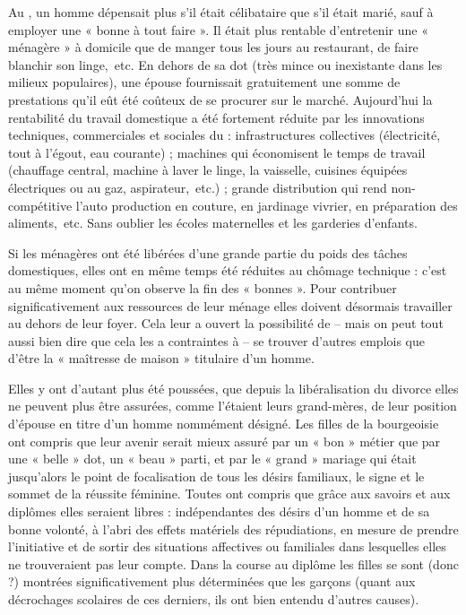  Au , un homme dépensait plus s'il était célibataire que s'il était marié, sauf à employer une « bonne à tout faire ». Il était plus rentable d'entretenir une « ménagère » à domicile que de manger tous les jours au restaurant, de faire blanchir son linge,~etc. En dehors de sa dot (très mince ou inexistante dans les milieux populaires), une épouse fournissait gratuitement une somme de prestations qu'il eût été coûteux de se procurer sur le marché. Aujourd'hui la rentabilité du travail domestique a été fortement réduite par les innovations techniques, commerciales et sociales du  : infrastructures collectives (électricité, tout à l'égout, eau courante) ; machines qui économisent le temps de travail (chauffage central, machine à laver le linge, la vaisselle, cuisines équipées électriques ou au gaz, aspirateur,~etc.) ; grande distribution qui rend non-compétitive l'auto production en couture, en jardinage vivrier, en préparation des aliments,~etc. Sans oublier les écoles maternelles et les garderies d'enfants. 

 Si les ménagères ont été libérées d'une grande partie du poids des tâches domestiques, elles ont en même temps été réduites au chômage technique : c'est au même moment qu'on observe la fin des « bonnes ». Pour contribuer significativement aux ressources de leur ménage elles doivent désormais travailler au dehors de leur foyer. Cela leur a ouvert la possibilité de -- mais on peut tout aussi bien dire que cela les a contraintes à -- se trouver d'autres emplois que d'être la « maîtresse de maison » titulaire d'un homme. 

 Elles y ont d'autant plus été poussées, que depuis la libéralisation du divorce elles ne peuvent plus être assurées, comme l'étaient leurs grand-mères, de leur position d'épouse en titre d'un homme nommément désigné. Les filles de la bourgeoisie ont compris que leur avenir serait mieux assuré par un « bon » métier que par une « belle » dot, un « beau » parti, et par le « grand » mariage qui était jusqu'alors le point de focalisation de tous les désirs familiaux, le signe et le sommet de la réussite féminine. Toutes ont compris que grâce aux savoirs et aux diplômes elles seraient libres : indépendantes des désirs d'un homme et de sa bonne volonté, à l'abri des effets matériels des répudiations, en mesure de prendre l'initiative et de sortir des situations affectives ou familiales dans lesquelles elles ne trouveraient pas leur compte. Dans la course au diplôme les filles se sont (donc ?) montrées significativement plus déterminées que les garçons (quant aux décrochages scolaires de ces derniers, ils ont bien entendu d'autres causes). 

